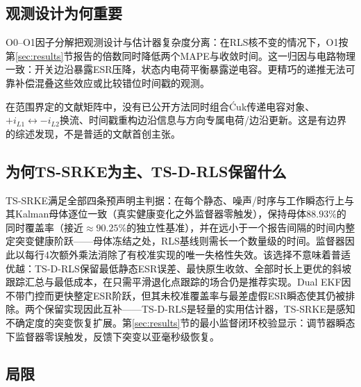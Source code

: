 \documentclass[zihao=5,a4paper]{ctexart}
\DeclareRobustCommand{\Cuk}{\mbox{\'{C}uk}}
\newcommand{\TSRLS}{TS-D-RLS}
\newcommand{\TSSRKE}{TS-SRKE}
\begin{document}
\subsection{观测设计为何重要}

O0--O1因子分解把观测设计与估计器复杂度分离：在RLS核不变的情况下，O1按第\ref{sec:results}节报告的倍数同时降低两个MAPE与收敛时间。这一归因与电路物理一致：开关边沿暴露ESR压降，状态内电荷平衡暴露逆电容。更精巧的递推无法可靠补偿混叠这些效应或比较错位时间戳的观测。

在范围界定的文献矩阵中，没有已公开方法同时组合\Cuk{}传递电容对象、$+i_{L1}\leftrightarrow-i_{L2}$换流、时间戳重构边沿信息与方向专属电荷/边沿更新。这是有边界的综述发现，不是普适的文献首创主张。

\subsection{为何\TSSRKE{}为主、\TSRLS{}保留什么}

\TSSRKE{}满足全部四条预声明主判据：在每个静态、噪声/时序与工作瞬态行上与其Kalman母体逐位一致（真实健康变化之外监督器零触发），保持母体$88.93\%$的同时覆盖率（接近$\approx90.25\%$的独立性基准），并在远小于一个报告间隔的时间内整定突变健康阶跃——母体冻结之处，RLS基线则需长一个数量级的时间。监督器因此以每行4次额外乘法消除了有校准实现的唯一失格性失效。该选择不意味着普适优越：\TSRLS{}保留最低静态ESR误差、最快原生收敛、全部时长上更优的斜坡跟踪汇总与最低成本，在只需平滑退化点跟踪的场合仍是推荐实现。Dual EKF因不带门控而更快整定ESR阶跃，但其未校准覆盖率与最差虚假ESR瞬态使其仍被排除。两个保留实现因此互补——\TSRLS{}是轻量的实用估计器，\TSSRKE{}是感知不确定度的突变恢复扩展。第\ref{sec:results}节的最小监督闭环校验显示：调节器瞬态下监督器零误触发，反馈下突变以亚毫秒级恢复。

\subsection{局限}
\end{document}
